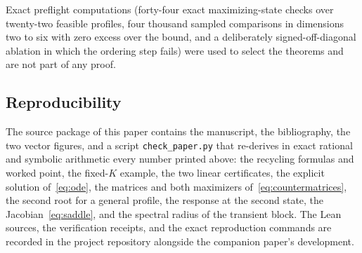 \documentclass[11pt,a4paper]{article}
\theoremstyle{plain}
\theoremstyle{definition}
\theoremstyle{remark}
\numberwithin{equation}{section}
\begin{document}
Exact preflight computations (forty-four exact maximizing-state checks over twenty-two feasible profiles, four thousand sampled comparisons in dimensions two to six with zero excess over the bound, and a deliberately signed-off-diagonal ablation in which the ordering step fails) were used to select the theorems and are not part of any proof.

\subsection{Reproducibility}
The source package of this paper contains the manuscript, the bibliography, the two vector figures, and a script \texttt{check\_paper.py} that re-derives in exact rational and symbolic arithmetic every number printed above: the recycling formulas and worked point, the fixed-$K$ example, the two linear certificates, the explicit solution of~\eqref{eq:ode}, the matrices and both maximizers of~\eqref{eq:countermatrices}, the second root for a general profile, the response at the second state, the Jacobian~\eqref{eq:saddle}, and the spectral radius of the transient block. The Lean sources, the verification receipts, and the exact reproduction commands are recorded in the project repository alongside the companion paper's development.



\end{document}
